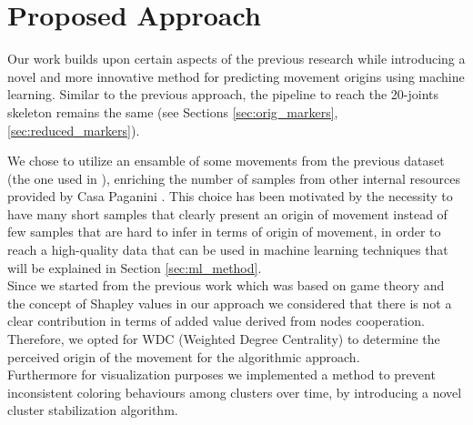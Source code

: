 \chapter{Proposed Approach}
Our work builds upon certain aspects of the previous research while introducing a novel and more innovative method for predicting movement origins using machine learning. 
Similar to the previous approach, the pipeline to reach the 20-joints skeleton remains the same (see Sections \ref{sec:orig_markers}, \ref{sec:reduced_markers}).

We chose to utilize an ensamble of some movements from the previous dataset (the one used in \cite{kolykhalova:2020}), enriching the number of samples from other internal resources provided by Casa Paganini \cite{casaPaganini}. 
This choice has been motivated by the necessity to have many short samples that clearly present an origin of movement instead of few samples that are hard to infer in terms of origin of movement, in order to 
reach a high-quality data that can be used in machine learning techniques that will be explained in Section \ref{sec:ml_method}.\\
Since we started from the previous work which was based on game theory and the concept of Shapley values in our approach we considered that there is not a clear contribution in terms of added value derived from nodes cooperation. 
Therefore, we opted for WDC (Weighted Degree Centrality) to determine the perceived origin of the movement for the algorithmic approach.\\
Furthermore for visualization purposes we implemented a method to prevent inconsistent coloring behaviours among clusters over time, by introducing a novel cluster stabilization algorithm. 


